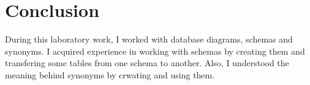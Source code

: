 \section*{Conclusion}

During this laboratory work, I worked with database diagrams, schemas and synonyms. I acquired experience in working with schemas by creating them and transfering some tables from one schema to another. Also, I understood the meaning behind synonyms by crwating and using them.

\bigskip
